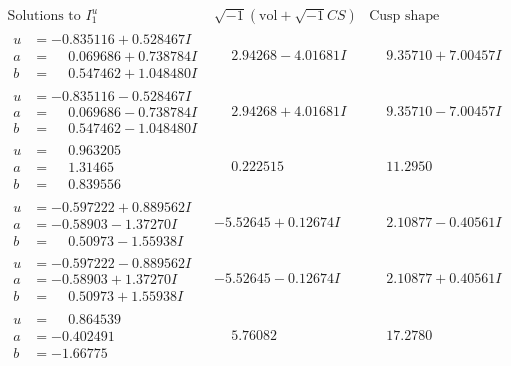 \documentclass[1p]{elsarticle_modified}
\theoremstyle{definition}
\newcommand{\I}{\sqrt{-1}}
\begin{document}
$$\begin{array}{c|c|c}  
\text{Solutions to }I^u_{1}& \I (\text{vol} + \sqrt{-1}CS) & \text{Cusp shape}\\
 \hline 
\begin{aligned}
u &= -0.835116 + 0.528467 I \\
a &= \phantom{-}0.069686 + 0.738784 I \\
b &= \phantom{-}0.547462 + 1.048480 I\end{aligned}
 & \phantom{-}2.94268 - 4.01681 I & \phantom{-}9.35710 + 7.00457 I \\ \hline\begin{aligned}
u &= -0.835116 - 0.528467 I \\
a &= \phantom{-}0.069686 - 0.738784 I \\
b &= \phantom{-}0.547462 - 1.048480 I\end{aligned}
 & \phantom{-}2.94268 + 4.01681 I & \phantom{-}9.35710 - 7.00457 I \\ \hline\begin{aligned}
u &= \phantom{-}0.963205\phantom{ +0.000000I} \\
a &= \phantom{-}1.31465\phantom{ +0.000000I} \\
b &= \phantom{-}0.839556\phantom{ +0.000000I}\end{aligned}
 & \phantom{-}0.222515\phantom{ +0.000000I} & \phantom{-}11.2950\phantom{ +0.000000I} \\ \hline\begin{aligned}
u &= -0.597222 + 0.889562 I \\
a &= -0.58903 - 1.37270 I \\
b &= \phantom{-}0.50973 - 1.55938 I\end{aligned}
 & -5.52645 + 0.12674 I & \phantom{-}2.10877 - 0.40561 I \\ \hline\begin{aligned}
u &= -0.597222 - 0.889562 I \\
a &= -0.58903 + 1.37270 I \\
b &= \phantom{-}0.50973 + 1.55938 I\end{aligned}
 & -5.52645 - 0.12674 I & \phantom{-}2.10877 + 0.40561 I \\ \hline\begin{aligned}
u &= \phantom{-}0.864539\phantom{ +0.000000I} \\
a &= -0.402491\phantom{ +0.000000I} \\
b &= -1.66775\phantom{ +0.000000I}\end{aligned}
 & \phantom{-}5.76082\phantom{ +0.000000I} & \phantom{-}17.2780\phantom{ +0.000000I} \\ \hline\begin{aligned}

\end{aligned}
\end{array}$$
\end{document}
